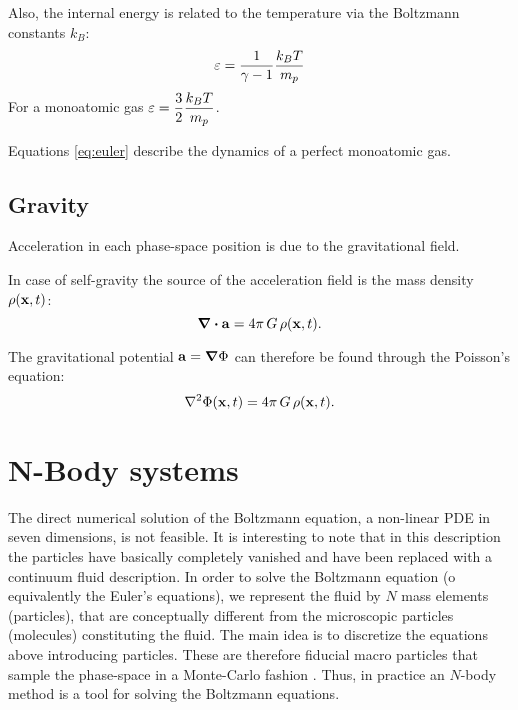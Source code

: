 Also, the internal energy is related to the temperature via the Boltzmann constants $k_B$:
\[ \varepsilon = \frac {1}{\gamma - 1} \frac{k_B T}{m_p}\]
For a monoatomic gas $\displaystyle \varepsilon = \frac 3 2 \frac{k_B T}{m_p}$.


Equations \eqref{eq:euler} describe the dynamics of a perfect monoatomic gas.

\subsection{Gravity}
Acceleration in each phase-space position is due to the gravitational field.

In case of self-gravity the source of the acceleration field is the mass density $\rho(\boldsymbol{\mathbf{x}}, t)$:
\begin{equation}
 \label{eq:poisson}
 \div \boldsymbol{\mathbf{a}} = 4 \pi \,G \, \rho(\boldsymbol{\mathbf{x}}, t).
\end{equation}

The gravitational potential $\boldsymbol{\mathbf{a}} = \grad \Phi$ can therefore be found through the Poisson's equation:
\begin{equation}
 \label{eq:poisson}
 \laplacian \Phi(\vect x,t) = 4 \pi \,G \, \rho(\vect x, t).
\end{equation}


\section{N-Body systems}
The direct numerical solution of the Boltzmann equation, a non-linear PDE in seven dimensions, is not feasible.
It is interesting to note that in this description the particles have basically completely vanished and have been replaced with a continuum fluid description.
In order to solve the Boltzmann equation (o equivalently the Euler's equations), we represent the fluid by $N$ mass elements (particles), that are conceptually different from the microscopic particles (molecules) constituting the fluid.
The main idea is to discretize the equations above introducing particles.
These are therefore fiducial macro particles that sample the phase-space in a Monte-Carlo fashion \citep{Springel2015}.
Thus, in practice an $N$-body method is a tool for solving the Boltzmann equations.

